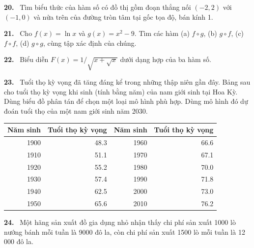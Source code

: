 \documentclass[12pt,a4paper]{article}
\newcommand{\bt}[1]{\par\smallskip\noindent\textbf{#1.}\ }
\begin{document}
\bt{20} Tìm biểu thức của hàm số có đồ thị gồm đoạn thẳng nối $(-2,2)$ với $(-1,0)$ và nửa trên của đường tròn tâm tại gốc tọa độ, bán kính 1.
\bt{21} Cho $f(x)=\ln x$ và $g(x)=x^2-9$. Tìm các hàm (a) $f\circ g$, (b) $g\circ f$, (c) $f\circ f$, (d) $g\circ g$, cùng tập xác định của chúng.
\bt{22} Biểu diễn $F(x)=1/\sqrt{x+\sqrt{x}}$ dưới dạng hợp của ba hàm số.
\bt{23} Tuổi thọ kỳ vọng đã tăng đáng kể trong những thập niên gần đây. Bảng sau cho tuổi thọ kỳ vọng khi sinh (tính bằng năm) của nam giới sinh tại Hoa Kỳ. Dùng biểu đồ phân tán để chọn một loại mô hình phù hợp. Dùng mô hình đó dự đoán tuổi thọ của một nam giới sinh năm 2030.
\begin{center}\begin{tabular}{rrrr}\toprule
Năm sinh&Tuổi thọ kỳ vọng&Năm sinh&Tuổi thọ kỳ vọng\\\midrule
1900&48.3&1960&66.6\\1910&51.1&1970&67.1\\1920&55.2&1980&70.0\\1930&57.4&1990&71.8\\1940&62.5&2000&73.0\\1950&65.6&2010&76.2\\\bottomrule
\end{tabular}\end{center}
\bt{24} Một hãng sản xuất đồ gia dụng nhỏ nhận thấy chi phí sản xuất 1000 lò nướng bánh mỗi tuần là 9000 đô la, còn chi phí sản xuất 1500 lò mỗi tuần là 12\,000 đô la.
\end{document}
